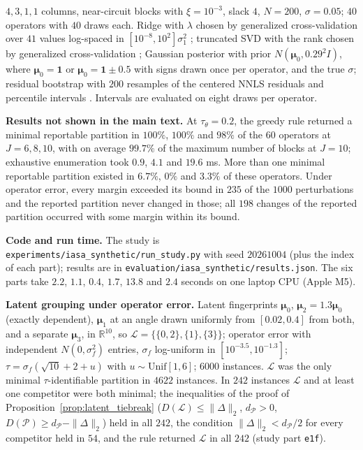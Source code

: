 \begin{itemize}[leftmargin=*,itemsep=0pt,topsep=2pt]
  \(4,3,1,1\) columns, near-circuit blocks with \(\xi=10^{-3}\), slack \(4\),
  \(N=200\), \(\sigma=0.05\); \(40\) operators with \(40\) draws each.  Ridge with
  \(\lambda\) chosen by generalized cross-validation over \(41\) values log-spaced in
  \([10^{-8},10^2]\sigma_1^2\) \citep{hoerl1970ridge,golub1979generalized}; truncated
  SVD with the rank chosen by generalized cross-validation \citep{hansen1987truncated};
  Gaussian posterior with prior \(N(\boldsymbol\mu_0,0.29^2I)\), where
  \(\boldsymbol\mu_0=\mathbf 1\) or \(\boldsymbol\mu_0=\mathbf 1\pm0.5\) with signs drawn
  once per operator, and the true \(\sigma\); residual bootstrap with \(200\) resamples
  of the centered NNLS residuals and percentile intervals
  \citep{efron1993introduction}.  Intervals are evaluated on eight draws per operator.
\end{itemize}

\noindent\textbf{Results not shown in the main text.}  At \(\tau_\theta=0.2\), the greedy
rule returned a minimal reportable partition in \(100\%\), \(100\%\) and \(98\%\) of the
\(60\) operators at \(J=6,8,10\), with on average \(99.7\%\) of the maximum number of blocks
at \(J=10\); exhaustive enumeration took \(0.9\), \(4.1\) and \(19.6\) ms.  More than one
minimal reportable partition existed in \(6.7\%\), \(0\%\) and \(3.3\%\) of these operators.
Under operator error, every margin exceeded its bound in \(235\) of the \(1000\)
perturbations and the reported partition never changed in those; all \(198\) changes of
the reported partition occurred with some margin within its bound.

\noindent\textbf{Code and run time.}  The study is
\texttt{experiments/iasa\_synthetic/run\_study.py} with seed \(20261004\) (plus the
index of each part); results are in \texttt{evaluation/iasa\_synthetic/results.json}.
The six parts take \(2.2\), \(1.1\), \(0.4\), \(1.7\), \(13.8\) and \(2.4\) seconds on one
laptop CPU (Apple M5).

\noindent\textbf{Latent grouping under operator error.}  Latent fingerprints
\(\boldsymbol\mu_0\), \(\boldsymbol\mu_2=1.3\boldsymbol\mu_0\) (exactly dependent),
\(\boldsymbol\mu_1\) at an angle drawn uniformly from \([0.02,0.4]\) from both, and a
separate \(\boldsymbol\mu_3\), in \(\mathbb R^{10}\), so \(\mathcal L=\{\{0,2\},\{1\},\{3\}\}\);
operator error with independent \(N(0,\sigma_f^2)\) entries, \(\sigma_f\) log-uniform in
\([10^{-3.5},10^{-1.3}]\); \(\tau=\sigma_f(\sqrt{10}+2+u)\) with \(u\sim\mathrm{Unif}[1,6]\);
\(6000\) instances.  \(\mathcal L\) was the only minimal \(\tau\)-identifiable partition in
\(4622\) instances.  In \(242\) instances \(\mathcal L\) and at least one competitor were
both minimal; the inequalities of the proof of Proposition~\ref{prop:latent_tiebreak}
(\(D(\mathcal L)\le\|\Delta\|_2\), \(d_{\mathcal P}>0\),
\(D(\mathcal P)\ge d_{\mathcal P}-\|\Delta\|_2\)) held in all \(242\), the condition
\(\|\Delta\|_2<d_{\mathcal P}/2\) for every competitor held in \(54\), and the rule
returned \(\mathcal L\) in all \(242\) (study part \texttt{e1f}).

